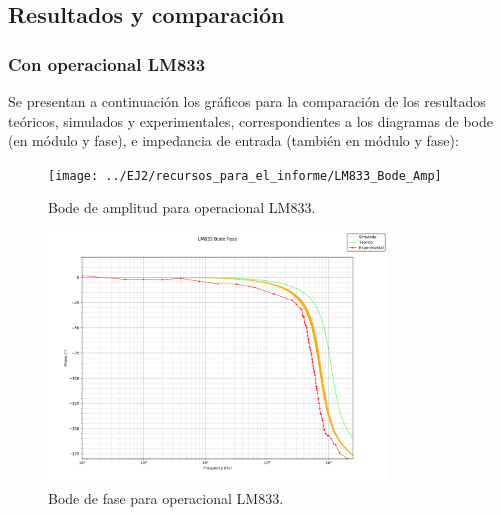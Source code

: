 \subsection{Resultados y comparación}
\subsubsection{Con operacional LM833}
Se presentan a continuación los gráficos para la comparación de los resultados teóricos, simulados y experimentales, correspondientes a los diagramas de bode (en módulo y fase), e impedancia de entrada (también en módulo y fase):
\begin{figure}[H]
    \begin{minipage}{\textwidth}
        \centering
        \texttt{[image: ../EJ2/recursos\_para\_el\_informe/LM833\_Bode\_Amp]}
        \caption{Bode de amplitud para operacional LM833.}
        \label{fig:LM833_Bode_Amp}
    \end{minipage}\hfill
\end{figure}
\begin{figure}[H]
    \begin{minipage}{\textwidth}
        \centering
        \includegraphics[width=0.8\textwidth]{../EJ2/recursos_para_el_informe/LM833_Bode_Fase}
        \caption{Bode de fase para operacional LM833.}
        \label{fig:LM833_Bode_Fase}
    \end{minipage}\hfill
\end{figure}

